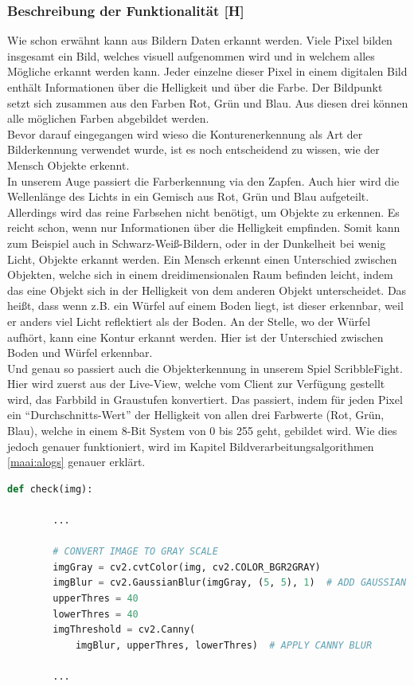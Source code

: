 \subsubsection{Beschreibung der Funktionalität [H]}\label{maai:beschrFunktionalitaet}

Wie schon erwähnt kann aus Bildern Daten erkannt werden. Viele Pixel bilden insgesamt ein Bild, welches visuell aufgenommen wird und in welchem alles Mögliche erkannt werden kann. Jeder einzelne dieser Pixel in einem digitalen Bild enthält Informationen über die Helligkeit und über die Farbe. Der Bildpunkt setzt sich zusammen aus den Farben Rot, Grün und Blau. Aus diesen drei können alle möglichen Farben abgebildet werden.
\\
Bevor darauf eingegangen wird wieso die Konturenerkennung als Art der Bilderkennung verwendet wurde, ist es noch entscheidend zu wissen, wie der Mensch Objekte erkennt.
\\
In unserem Auge passiert die Farberkennung via den Zapfen. Auch hier wird die Wellenlänge des Lichts in ein Gemisch aus Rot, Grün und Blau aufgeteilt. Allerdings wird das reine Farbsehen nicht benötigt, um Objekte zu erkennen. Es reicht schon, wenn nur Informationen über die Helligkeit empfinden. Somit kann zum Beispiel auch in Schwarz-Weiß-Bildern, oder in der Dunkelheit bei wenig Licht, Objekte erkannt werden. Ein Mensch erkennt einen Unterschied zwischen Objekten, welche sich in einem dreidimensionalen Raum befinden leicht, indem das eine Objekt sich in der Helligkeit von dem anderen Objekt unterscheidet. Das heißt, dass wenn z.B. ein Würfel auf einem Boden liegt, ist dieser erkennbar, weil er anders viel Licht reflektiert als der Boden. An der Stelle, wo der Würfel aufhört, kann eine Kontur erkannt werden. Hier ist der Unterschied zwischen Boden und Würfel erkennbar.
\\
Und genau so passiert auch die Objekterkennung in unserem Spiel ScribbleFight. Hier wird zuerst aus der Live-View, welche vom Client zur Verfügung gestellt wird, das Farbbild in Graustufen konvertiert. Das passiert, indem für jeden Pixel ein ``Durchschnitts-Wert'' der Helligkeit von allen drei Farbwerte (Rot, Grün, Blau), welche in einem 8-Bit System von 0 bis 255 geht, gebildet wird. Wie dies jedoch genauer funktioniert, wird im Kapitel Bildverarbeitungsalgorithmen
\ref{maai:alogs}
genauer erklärt.

\begin{lstlisting}[caption=Alle unnötigen Bilddaten entfernen,language=Python,label=lst:impl:filters]
    def check(img):
        
        ...

        # CONVERT IMAGE TO GRAY SCALE
        imgGray = cv2.cvtColor(img, cv2.COLOR_BGR2GRAY)
        imgBlur = cv2.GaussianBlur(imgGray, (5, 5), 1)  # ADD GAUSSIAN BLUR
        upperThres = 40
        lowerThres = 40
        imgThreshold = cv2.Canny(
            imgBlur, upperThres, lowerThres)  # APPLY CANNY BLUR
        
        ...
\end{lstlisting}


